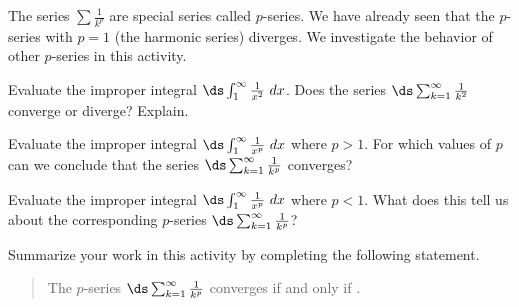 \begin{activity} \label{8.3.Act5} The series $\sum \frac{1}{k^p}$ are special series called $p$-series. We have already seen that the $p$-series with $p=1$ (the harmonic series) diverges. We investigate the behavior of other $p$-series in this activity.
\ba
    \item Evaluate the improper integral $\ds \int_1^{\infty} \frac{1}{x^2} \ dx$. Does the series $\ds \sum_{k=1}^{\infty} \frac{1}{k^2}$
converge or diverge? Explain.


    \item Evaluate the improper integral $\ds \int_1^{\infty} \frac{1}{x^p} \ dx$ where $p > 1$. For which values of $p$ can we conclude that the series $\ds \sum_{k=1}^{\infty} \frac{1}{k^p}$
converges? 

    \item Evaluate the improper integral $\ds \int_1^{\infty} \frac{1}{x^p} \ dx$ where $p < 1$. What does this tell us about the corresponding $p$-series
$\ds \sum_{k=1}^{\infty} \frac{1}{k^p}$?

\item Summarize your work in this activity by completing the following statement.
\begin{quote}
The $p$-series $\ds \sum_{k=1}^{\infty} \frac{1}{k^p}$ converges if and only if \underline{\hspace{2in}}.
\end{quote}

\ea
\end{activity}

